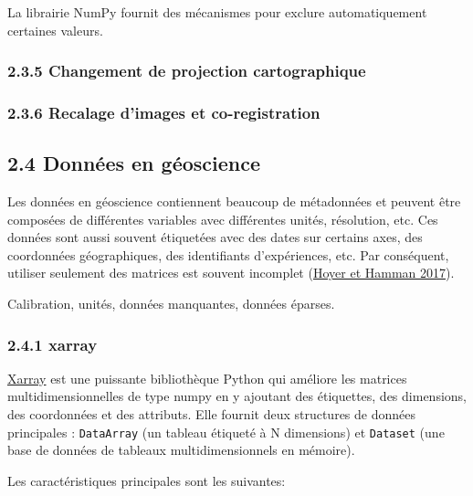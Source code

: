 La librairie NumPy fournit des mécanismes pour exclure automatiquement
certaines valeurs.

\subsubsection{\texorpdfstring{{2.3.5} Changement de projection
cartographique}{2.3.5 Changement de projection cartographique}}\label{changement-de-projection-cartographique}

\subsubsection{\texorpdfstring{{2.3.6} Recalage d'images et
co-registration}{2.3.6 Recalage d'images et co-registration}}\label{recalage-dimages-et-co-registration}

\subsection{\texorpdfstring{{2.4} Données en
géoscience}{2.4 Données en géoscience}}\label{donnuxe9es-en-guxe9oscience}

Les données en géoscience contiennent beaucoup de métadonnées et peuvent
être composées de différentes variables avec différentes unités,
résolution, etc. Ces données sont aussi souvent étiquetées avec des
dates sur certains axes, des coordonnées géographiques, des identifiants
d'expériences, etc. Par conséquent, utiliser seulement des matrices est
souvent incomplet {(\href{references.html\#ref-xarray-2017}{Hoyer et
Hamman 2017})}.

Calibration, unités, données manquantes, données éparses.

\subsubsection{\texorpdfstring{{2.4.1}
xarray}{2.4.1 xarray}}\label{xarray}

\href{https://docs.xarray.dev/en/latest/getting-started-guide/why-xarray.html}{Xarray}
est une puissante bibliothèque Python qui améliore les matrices
multidimensionnelles de type numpy en y ajoutant des étiquettes, des
dimensions, des coordonnées et des attributs. Elle fournit deux
structures de données principales : \texttt{DataArray} (un tableau
étiqueté à N dimensions) et \texttt{Dataset} (une base de données de
tableaux multidimensionnels en mémoire).

Les caractéristiques principales sont les suivantes:

